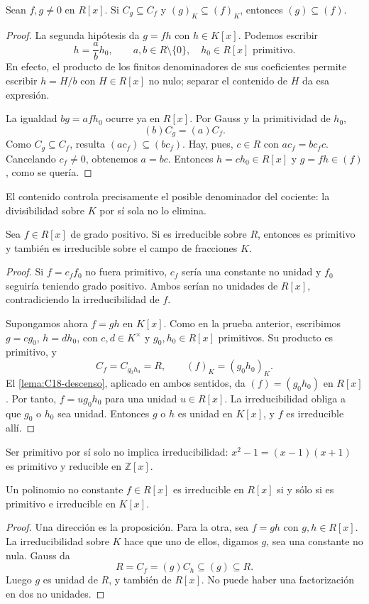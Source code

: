 \begin{lema}\label{lema:C18-descenso}
Sean $f,g\ne0$ en $R[x]$. Si $C_g\subseteq C_f$ y $(g)_K\subseteq(f)_K$, entonces $(g)\subseteq(f)$.
\end{lema}
\begin{proof}
La segunda hipótesis da $g=fh$ con $h\in K[x]$. Podemos escribir
\[
h=\frac ab h_0,\qquad a,b\in R\setminus\{0\},\quad h_0\in R[x]\text{ primitivo}.
\]
En efecto, el producto de los finitos denominadores de sus coeficientes permite escribir $h=H/b$ con $H\in R[x]$ no nulo; separar el contenido de $H$ da esa expresión.

La igualdad $bg=afh_0$ ocurre ya en $R[x]$. Por Gauss y la primitividad de $h_0$,
\[
(b)C_g=(a)C_f.
\]
Como $C_g\subseteq C_f$, resulta $(ac_f)\subseteq(bc_f)$. Hay, pues, $c\in R$ con $ac_f=bc_fc$. Cancelando $c_f\ne0$, obtenemos $a=bc$. Entonces $h=ch_0\in R[x]$ y $g=fh\in(f)$, como se quería.
\end{proof}
El contenido controla precisamente el posible denominador del cociente: la divisibilidad sobre $K$ por sí sola no lo elimina.

\begin{prop}\label{prop:C18-irred-fracciones}
Sea $f\in R[x]$ de grado positivo. Si es irreducible sobre $R$, entonces es primitivo y también es irreducible sobre el campo de fracciones $K$.
\end{prop}
\begin{proof}
Si $f=c_ff_0$ no fuera primitivo, $c_f$ sería una constante no unidad y $f_0$ seguiría teniendo grado positivo. Ambos serían no unidades de $R[x]$, contradiciendo la irreducibilidad de $f$.

Supongamos ahora $f=gh$ en $K[x]$. Como en la prueba anterior, escribimos $g=cg_0$, $h=dh_0$, con $c,d\in K^\times$ y $g_0,h_0\in R[x]$ primitivos. Su producto es primitivo, y
\[
C_f=C_{g_0h_0}=R,\qquad (f)_K=(g_0h_0)_K.
\]
El \cref{lema:C18-descenso}, aplicado en ambos sentidos, da $(f)=(g_0h_0)$ en $R[x]$. Por tanto, $f=ug_0h_0$ para una unidad $u\in R[x]$. La irreducibilidad obliga a que $g_0$ o $h_0$ sea unidad. Entonces $g$ o $h$ es unidad en $K[x]$, y $f$ es irreducible allí.
\end{proof}
Ser primitivo por sí solo no implica irreducibilidad: $x^2-1=(x-1)(x+1)$ es primitivo y reducible en $\mathbb Z[x]$.

\begin{coro}\label{coro:C18-criterio-irred}
Un polinomio no constante $f\in R[x]$ es irreducible en $R[x]$ si y sólo si es primitivo e irreducible en $K[x]$.
\end{coro}
\begin{proof}
Una dirección es la proposición. Para la otra, sea $f=gh$ con $g,h\in R[x]$. La irreducibilidad sobre $K$ hace que uno de ellos, digamos $g$, sea una constante no nula. Gauss da
\[
R=C_f=(g)C_h\subseteq(g)\subseteq R.
\]
Luego $g$ es unidad de $R$, y también de $R[x]$. No puede haber una factorización en dos no unidades.
\end{proof}

